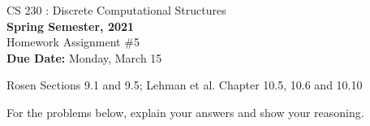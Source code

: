 \setlength{\oddsidemargin}{12pt}
\setlength{\textwidth}{6.5in}
\setlength{\textheight}{9in}
\pagestyle{empty}
\setlength{\parskip}{7pt plus 2pt minus 2pt}



    \begin{center}
    {{\large CS 230 : Discrete Computational Structures}}
        \\

        {\bf Spring Semester, 2021}\\

        {\sc Homework Assignment \#5}\\
        {\bf Due Date:}  Monday, March 15
    \end{center}

     Rosen Sections 9.1 and 9.5; Lehman et al. Chapter 10.5, 10.6 and 10.10

    For the problems below, explain your answers and show your reasoning.

